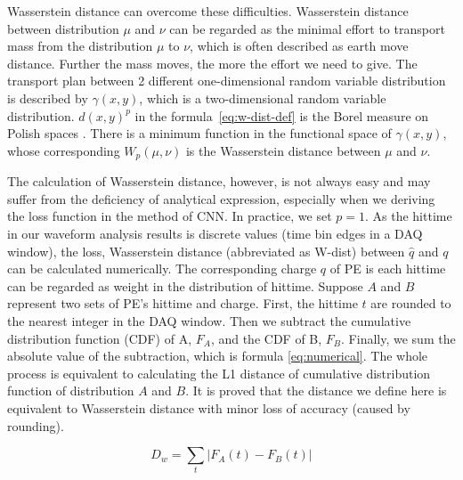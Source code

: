 Wasserstein distance can overcome these difficulties. Wasserstein distance between distribution $\mu$ and $\nu$ can be regarded as the minimal effort to transport mass from the distribution $\mu$ to $\nu$, which is often described as earth move distance. Further the mass moves, the more the effort we need to give. The transport plan between 2 different one-dimensional random variable distribution is described by $\gamma(x, y)$, which is a two-dimensional random variable distribution. $d(x,y)^{p}$ in the formula~\eqref{eq:w-dist-def} is the Borel measure on Polish spaces \cite{villani_2009}. There is a minimum function in the functional space of $\gamma(x, y)$, whose corresponding $W_{p}(\mu,\nu)$ is the Wasserstein distance between $\mu$ and $\nu$. 

The calculation of Wasserstein distance, however, is not always easy and may suffer from the deficiency of analytical expression, especially when we deriving the loss function in the method of CNN. In practice, we set $p=1$. As the hittime in our waveform analysis results is discrete values (time bin edges in a DAQ window), the loss, Wasserstein distance (abbreviated as W-dist) between $\hat{q}$ and $q$ can be calculated numerically. The corresponding charge $q$ of PE is each hittime can be regarded as weight in the distribution of hittime. Suppose $A$ and $B$ represent two sets of PE's hittime and charge. First, the hittime $t$ are rounded to the nearest integer in the DAQ window. Then we subtract the cumulative distribution function (CDF) of A, $F_{A}$, and the CDF of B, $F_{B}$. Finally, we sum the absolute value of the subtraction, which is formula \eqref{eq:numerical}. The whole process is equivalent to calculating the L1 distance of cumulative distribution function of distribution $A$ and $B$. It is proved that the distance we define here is equivalent to Wasserstein distance with minor loss of accuracy (caused by rounding). 

\begin{equation}
    D_w = \sum_t|F_{A}(t) - F_{B}(t)|
    \label{eq:numerical}
\end{equation}
